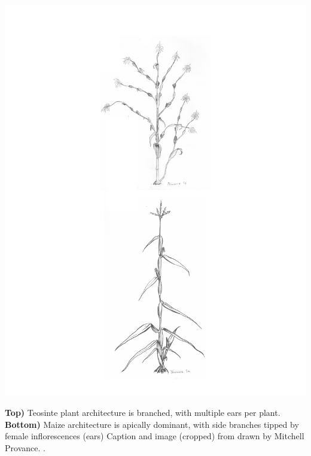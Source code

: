 \begin{marginfigure}
\begin{center}
  \includegraphics[width = \textwidth]{illustration_images/hitchhiking/maize_teosinte/maize_teosinte_tall.pdf}
\end{center}
\caption{{\bf Top)} Teosinte plant architecture is branched, with
  multiple ears per plant. {\bf Bottom)} Maize architecture is apically dominant, with side branches tipped by female inflorescences
(ears) Caption and image (cropped) from \citet{stitzer2018maize} drawn
by Mitchell Provance. \PLOSccBY. } \label{Fig:branched_teosinte} %
\end{marginfigure}

